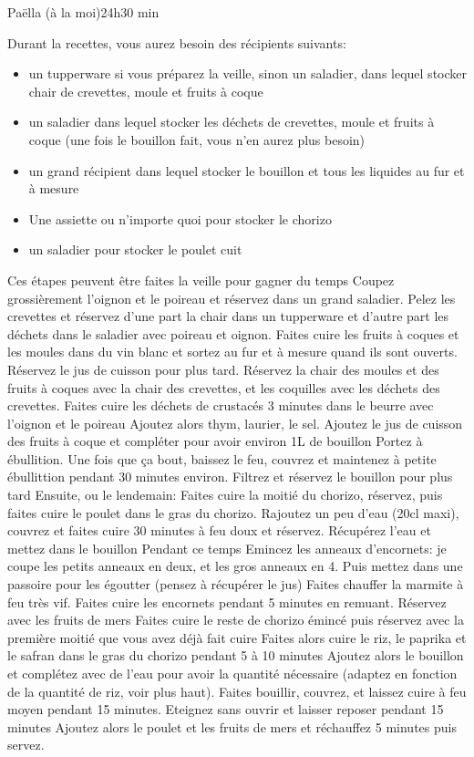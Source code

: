 {\begin{recette}{Paëlla (à la moi)}{2}{4h}{30 min}
\begin{preparation}
\etape Durant la recettes, vous aurez besoin des récipients suivants:
\begin{itemize}
\item un tupperware si vous préparez la veille, sinon un saladier, dans lequel stocker chair de crevettes, moule et fruits à coque
\item un saladier dans lequel stocker les déchets de crevettes, moule et fruits à coque (une fois le bouillon fait, vous n'en aurez plus besoin)
\item un grand récipient dans lequel stocker le bouillon et tous les liquides au fur et à mesure
\item Une assiette ou n'importe quoi pour stocker le chorizo
\item un saladier pour stocker le poulet cuit
\end{itemize}
\etape Ces étapes peuvent être faites la veille pour gagner du temps
\etape Coupez grossièrement l'oignon et le poireau et réservez dans un grand saladier.
\etape Pelez les crevettes et réservez d'une part la chair dans un tupperware et d'autre part les déchets dans le saladier avec poireau et oignon.
\etape Faites cuire les fruits à coques et les moules dans du vin blanc et sortez au fur et à mesure quand ils sont ouverts.
\etape Réservez le jus de cuisson pour plus tard. 
\etape Réservez la chair des moules et des fruits à coques avec la chair des crevettes, et les coquilles avec les déchets des crevettes.
\etape Faites cuire les déchets de crustacés 3 minutes dans le beurre avec l'oignon et le poireau
\etape Ajoutez alors thym, laurier, le sel. Ajoutez le jus de cuisson des fruits à coque et compléter pour avoir environ 1L de bouillon
\etape Portez à ébullition. Une fois que ça bout, baissez le feu, couvrez et maintenez à petite ébullittion pendant 30 minutes environ. 
\etape Filtrez et réservez le bouillon pour plus tard
\etape Ensuite, ou le lendemain:
\etape Faites cuire la moitié du chorizo, réservez, puis faites cuire le poulet dans le gras du chorizo. Rajoutez un peu d'eau (20cl maxi), couvrez et faites cuire 30 minutes à feu doux et réservez. Récupérez l'eau et mettez dans le bouillon
\etape Pendant ce temps Emincez les anneaux d'encornets: je coupe les petits anneaux en deux, et les gros anneaux en 4. Puis mettez dans une passoire pour les égoutter (pensez à récupérer le jus)
\etape Faites chauffer la marmite à feu très vif. Faites cuire les encornets pendant 5 minutes en remuant. Réservez avec les fruits de mers
\etape Faites cuire le reste de chorizo émincé puis réservez avec la première moitié que vous avez déjà fait cuire
\etape Faites alors cuire le riz, le paprika et le safran dans le gras du chorizo pendant 5 à 10 minutes
\etape Ajoutez alors le bouillon et complétez avec de l'eau pour avoir la quantité nécessaire (adaptez en fonction de la quantité de riz, voir plus haut). 
\etape Faites bouillir, couvrez, et laissez cuire à feu moyen pendant 15 minutes. 
\etape Eteignez sans ouvrir et laisser reposer pendant 15 minutes
\etape Ajoutez alors le poulet et les fruits de mers et réchauffez 5 minutes puis servez.
\end{preparation}
\end{recette}

}
